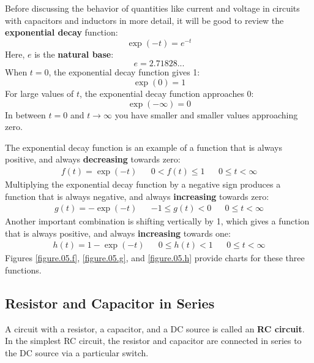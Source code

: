 Before discussing the behavior of quantities like current and voltage in circuits with capacitors and inductors in more detail, it will be good to review the \textbf{exponential decay} function:
\begin{equation}
    \exp(-t) = e^{-t}
\end{equation}
Here, $e$ is the \textbf{natural base}:
\begin{equation}
    e = 2.71828...
\end{equation}
When $t = 0$, the exponential decay function gives 1:
\begin{equation}
    \exp(0) = 1
\end{equation}
For large values of $t$, the exponential decay function approaches 0:
\begin{equation}
    \exp(-\infty) = 0
\end{equation}
In between $t = 0$ and $t \rightarrow \infty$ you have smaller and smaller values approaching zero.

The exponential decay function is an example of a function that is always positive, and always \textbf{decreasing} towards zero:
\begin{align}
    f(t) = \exp(-t) && 0 < f(t) \leq 1 && 0 \leq t < \infty
\end{align}
Multiplying the exponential decay function by a negative sign produces a function that is always negative, and always \textbf{increasing} towards zero:
\begin{align}
    g(t) = -\exp(-t) && -1 \leq g(t) < 0 && 0 \leq t < \infty
\end{align}
Another important combination is shifting vertically by 1, which gives a function that is always positive, and always \textbf{increasing} towards one:
\begin{align}
    h(t) = 1 - \exp(-t) && 0 \leq h(t) < 1 && 0 \leq t < \infty
\end{align}
Figures \ref{figure.05.f}, \ref{figure.05.g}, and \ref{figure.05.h} provide charts for these three functions.
%
\subsection{Resistor and Capacitor in Series}
%
A circuit with a resistor, a capacitor, and a DC source is called an \textbf{RC circuit}. In the simplest RC circuit, the resistor and capacitor are connected in series to the DC source via a particular switch.
%
